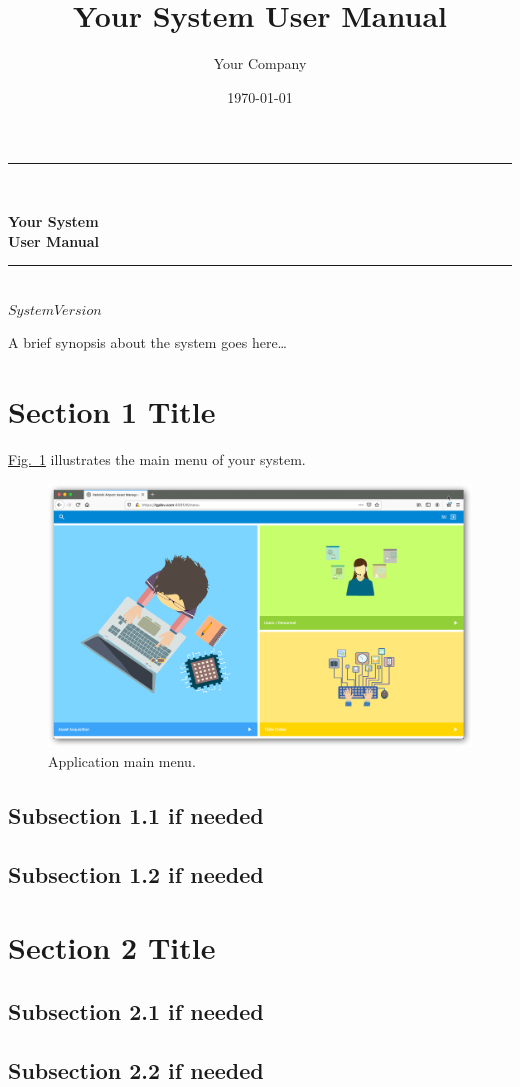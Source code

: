 \documentclass[a4paper, 12pt, final]{hitec}
\title{Your System User Manual}
\author{Your Company}
\date{\today}
\begin{document}
	\onehalfspacing
  \begin{titlepage}
  \centering
    \vspace*{0.5 cm}
  \rule{\linewidth}{0.2 mm} \\[0.4cm]
  \begin{spacing}{1.1}
    \huge \bfseries Your System\\[0.3cm]
    \LARGE User Manual
  \end{spacing}
  \rule{\linewidth}{0.2 mm} \\[1 cm]
  \textsc{\large $System Version$}\\[4cm]
  \clearpage
  
  \setcounter{page}{1}
  \justifying
  A brief synopsis about the system goes here\ldots
  \clearpage
    
  \setcounter{tocdepth}{3}
  \tableofcontents
  \clearpage
  
  \end{titlepage}
    \section{Section 1 Title}\label{sec:01}

  \hyperref[sec:01_01:fig:01]{Fig.~\ref*{sec:01_01:fig:01}} illustrates the main menu of your system.

	\begin{figure}[!htbp]
	\centering
	\includegraphics[width=0.95\linewidth]{images/01-main-menu.png}
	\caption{Application main menu.}\label{sec:01_01:fig:01}
	\end{figure}

  \subsection{Subsection 1.1 if needed}
  \subsection{Subsection 1.2 if needed}

  \section{Section 2 Title}\label{sec:02}

  \subsection{Subsection 2.1 if needed}
  \subsection{Subsection 2.2 if needed}
\end{document}
